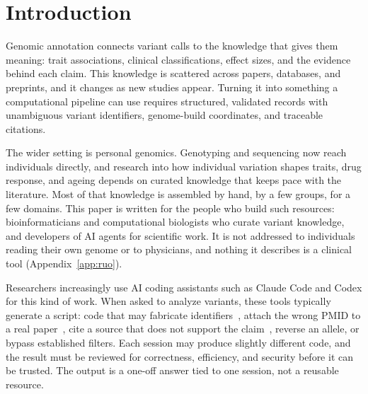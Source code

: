 \documentclass[11pt,a4paper]{article}
\begin{document}
\section{Introduction}

Genomic annotation connects variant calls to the knowledge that gives them
meaning: trait associations, clinical classifications, effect sizes, and the
evidence behind each claim. This knowledge is scattered across papers, databases,
and preprints, and it changes as new studies appear. Turning it into something a
computational pipeline can use requires structured, validated records with
unambiguous variant identifiers, genome-build coordinates, and traceable
citations.

The wider setting is personal genomics. Genotyping and sequencing now reach
individuals directly, and research into how individual variation shapes
traits, drug response, and ageing depends on curated knowledge that keeps pace
with the literature. Most of that knowledge is assembled by hand, by a few
groups, for a few domains. This paper is written for the people who build such
resources: bioinformaticians and computational biologists who curate variant
knowledge, and developers of AI agents for scientific work. It is not addressed
to individuals reading their own genome or to physicians, and nothing it
describes is a clinical tool (Appendix~\ref{app:ruo}).

Researchers increasingly use AI coding assistants such as Claude Code and Codex
for this kind of work. When asked to analyze variants, these tools
typically generate a script: code that may fabricate
identifiers~\citep{shang2025geneturing}, attach the wrong PMID to a real
paper~\citep{bhattacharyya2023high}, cite a source that does not support the
claim~\citep{gao2023enabling}, reverse an allele, or bypass
established filters. Each session may produce slightly different code, and the
result must be reviewed for correctness, efficiency, and security before it can
be trusted. The output is a one-off answer tied to one session, not a reusable
resource.
\end{document}
